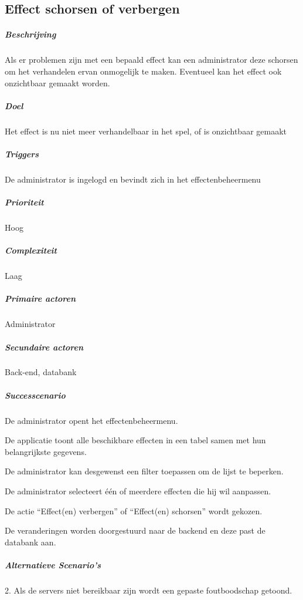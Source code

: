 \subsection{Effect schorsen of verbergen}
\begin{compact}
\subparagraph{Beschrijving} Als er problemen zijn met een bepaald effect kan een administrator deze schorsen om het verhandelen ervan onmogelijk te maken. Eventueel kan het effect ook onzichtbaar gemaakt worden.
\subparagraph{Doel} Het effect is nu niet meer verhandelbaar in het spel, of is onzichtbaar gemaakt
\subparagraph{Triggers}De administrator is ingelogd en bevindt zich in het effectenbeheermenu
\subparagraph{Prioriteit}Hoog
\subparagraph{Complexiteit}Laag
\subparagraph{Primaire actoren}Administrator
\subparagraph{Secundaire actoren}Back-end, databank
\subparagraph{Successcenario}
\begin{enumerate_compact}
 \item De administrator opent het effectenbeheermenu.
 \item De applicatie toont alle beschikbare effecten in een tabel samen met hun belangrijkste gegevens.
 \item De administrator kan desgewenst een filter toepassen om de lijst te beperken.
 \item De administrator selecteert \'e\'en of meerdere effecten die hij wil aanpassen.
 \item De actie ``Effect(en) verbergen'' of ``Effect(en) schorsen'' wordt gekozen.
 \item De veranderingen worden doorgestuurd naar de backend en deze past de databank aan.
\end{enumerate_compact}
\subparagraph{Alternatieve Scenario's}
\begin{enumerate_compact}
	\item[2.] Als de servers niet bereikbaar zijn wordt een gepaste foutboodschap getoond.
\end{enumerate_compact}
\end{compact}

